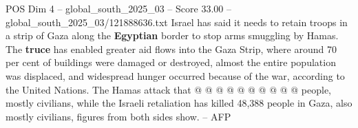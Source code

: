 \begin{textsample}{POS Dim 4 – global\_south\_2025\_03 – Score 33.00 – global\_south\_2025\_03/121888636.txt}
Israel has said it needs to retain troops in a strip of Gaza along the \textbf{Egyptian} border to stop arms smuggling by Hamas.
The \textbf{truce} has enabled greater aid flows into the Gaza Strip, where around 70 per cent of buildings were damaged or destroyed, almost the entire population was displaced, and widespread hunger occurred because of the war, according to the United Nations.
The Hamas attack that @ @ @ @ @ @ @ @ @ @ people, mostly civilians, while the Israeli retaliation has killed 48,388 people in Gaza, also mostly civilians, figures from both sides show. -- AFP

\end{textsample}
